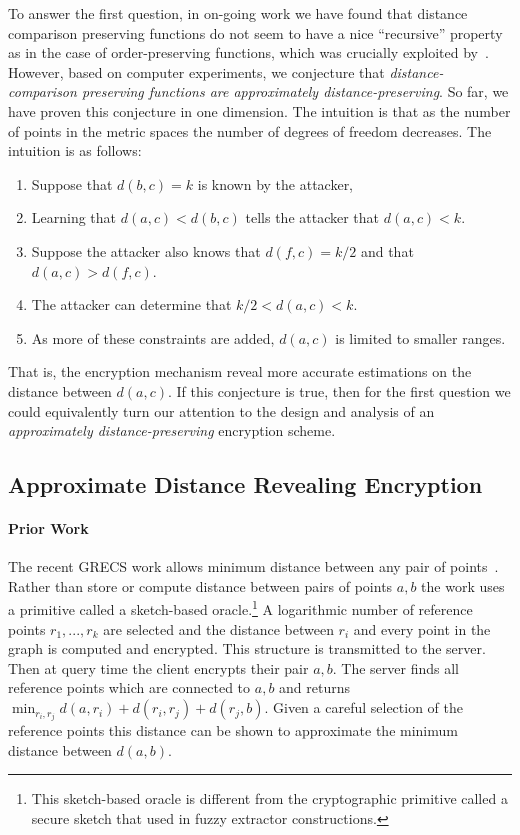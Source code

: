To answer the first question, in on-going work we have found that distance comparison preserving functions do not seem to have a nice ``recursive'' property as in the case of order-preserving functions, which was crucially exploited by~\cite{EC:BCLO09}.  However, based on computer experiments, we conjecture that \emph{distance-comparison preserving functions are approximately distance-preserving}.    So far, we have proven this conjecture in one dimension.  The intuition is that as the number of points in the metric spaces the number of degrees of freedom decreases.  The intuition is as follows:
\begin{enumerate}\setlength\itemsep{0em}
\item Suppose that $d(b,c) = k$ is known by the attacker, 
\item Learning that $d(a,c) < d(b,c)$ tells the attacker that $d(a,c)<k$.  
\item Suppose the attacker also knows that $d(f, c) = k/2$ and that $d(a,c) > d(f,c)$.  
\item The attacker can determine that $k/2< d(a,c) <k$.  
\item As more of these constraints are added, $d(a,c)$ is limited to smaller ranges.
\end{enumerate}
That is, the encryption mechanism reveal more accurate estimations on  the distance between $d(a,c)$.
If this conjecture is true, then for the first question we could equivalently turn our attention to the design and analysis of  an \emph{approximately distance-preserving} encryption scheme. 

\subsection{Approximate Distance Revealing Encryption}
\paragraph{Prior Work}
The recent GRECS work allows minimum distance between any pair of points~\cite{CCS:MKNK15}.  Rather than store or compute distance between pairs of points $a,b$ the work uses a primitive called a sketch-based oracle.\footnote{This sketch-based oracle is different from the cryptographic primitive called a secure sketch that used in fuzzy extractor constructions.}  A logarithmic number of reference points $r_1,..., r_k$ are selected and the distance between $r_i$ and every point in the graph is computed and encrypted.  This structure is transmitted to the server.  Then at query time the client encrypts their pair $a,b$.  The server finds all reference points which are connected to $a,b$ and returns $\min_{r_i, r_j} d(a,r_i) + d(r_i, r_j) + d(r_j, b)$.  Given a careful selection of the reference points this distance can be shown to approximate the minimum distance between $d(a,b)$.

